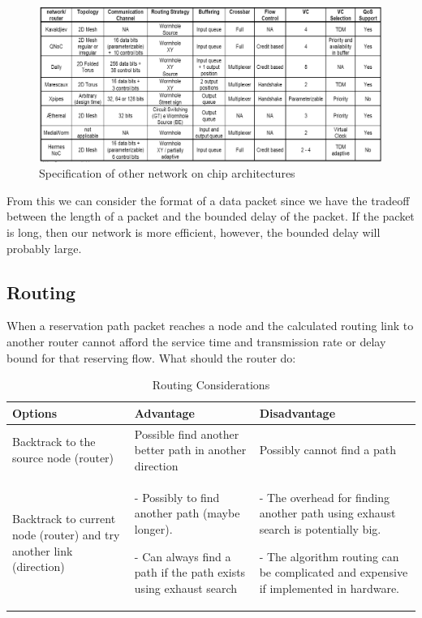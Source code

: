 \documentclass[a4]{article}
\begin{document}
\begin{figure}[htp]
\centering
\includegraphics[width=15cm]{pics/OtherArcs.png}
\caption[Other Spec.]
{Specification of other network on chip architectures}\label{fig:otherSpec}
\end{figure}

From this we can consider the format of a data packet since we have the 
tradeoff between the length of a packet and the bounded delay of the packet. 
If the packet is long, then our network is more efficient, however, the bounded 
delay will probably large.
\subsection{Routing}
When a reservation path packet reaches a node and the calculated routing link 
to another router cannot afford the service time and transmission rate or delay 
bound for that reserving flow. What should the router do:

\begin{table}[h]
\begin{center}
  \begin{tabular}{ | p{3cm} | p{4cm} | p{4cm} |}
    \hline
	Options & Advantage & Disadvantage \\ \hline
	Backtrack to the source node (router) & 
	Possible find another better path in another direction &
	Possibly cannot find a path \\ \hline
	Backtrack to current node (router) and try another link (direction) &
	- Possibly to find another path (maybe longer).  

	- Can always find a path if the path exists using exhaust search	&
	- The overhead for finding another path using exhaust search is potentially  big.

	- The algorithm routing can be complicated and expensive if implemented in hardware. \\
    \hline
  \end{tabular}
\end{center}
\caption{Routing Considerations}
\label{table:RoutingConsiderations}
\end{table}
\end{document}
